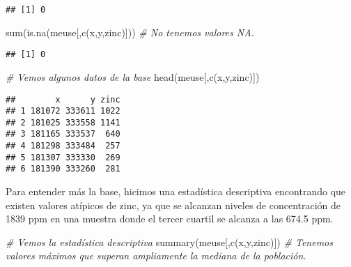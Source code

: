 \documentclass[
  12pt,
]{article}
\newenvironment{Shaded}{\begin{snugshade}}{\end{snugshade}}
\newcommand{\CommentTok}[1]{\textcolor[rgb]{0.56,0.35,0.01}{\textit{#1}}}
\newcommand{\FunctionTok}[1]{\textcolor[rgb]{0.00,0.00,0.00}{#1}}
\newcommand{\NormalTok}[1]{#1}
\newcommand{\StringTok}[1]{\textcolor[rgb]{0.31,0.60,0.02}{#1}}
\begin{document}
\begin{verbatim}
## [1] 0
\end{verbatim}

\begin{Shaded}
\begin{Highlighting}[]
\FunctionTok{sum}\NormalTok{(}\FunctionTok{is.na}\NormalTok{(meuse[,}\FunctionTok{c}\NormalTok{(}\StringTok{\textquotesingle{}x\textquotesingle{}}\NormalTok{,}\StringTok{\textquotesingle{}y\textquotesingle{}}\NormalTok{,}\StringTok{\textquotesingle{}zinc\textquotesingle{}}\NormalTok{)])) }\CommentTok{\# No tenemos valores NA. }
\end{Highlighting}
\end{Shaded}

\begin{verbatim}
## [1] 0
\end{verbatim}

\begin{Shaded}
\begin{Highlighting}[]
\CommentTok{\# Vemos algunos datos de la base}
\FunctionTok{head}\NormalTok{(meuse[,}\FunctionTok{c}\NormalTok{(}\StringTok{\textquotesingle{}x\textquotesingle{}}\NormalTok{,}\StringTok{\textquotesingle{}y\textquotesingle{}}\NormalTok{,}\StringTok{\textquotesingle{}zinc\textquotesingle{}}\NormalTok{)])}
\end{Highlighting}
\end{Shaded}

\begin{verbatim}
##        x      y zinc
## 1 181072 333611 1022
## 2 181025 333558 1141
## 3 181165 333537  640
## 4 181298 333484  257
## 5 181307 333330  269
## 6 181390 333260  281
\end{verbatim}

Para entender más la base, hicimos una estadística descriptiva
encontrando que existen valores atípicos de zinc, ya que se alcanzan
niveles de concentración de 1839 ppm en una muestra donde el tercer
cuartil se alcanza a las 674.5 ppm.

\begin{Shaded}
\begin{Highlighting}[]
\CommentTok{\# Vemos la estadística descriptiva}
\FunctionTok{summary}\NormalTok{(meuse[,}\FunctionTok{c}\NormalTok{(}\StringTok{\textquotesingle{}x\textquotesingle{}}\NormalTok{,}\StringTok{\textquotesingle{}y\textquotesingle{}}\NormalTok{,}\StringTok{\textquotesingle{}zinc\textquotesingle{}}\NormalTok{)]) }\CommentTok{\# Tenemos valores máximos que superan ampliamente la mediana de la población. }
\end{Highlighting}
\end{Shaded}
\end{document}
